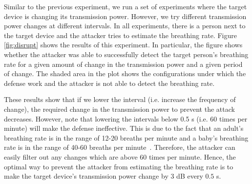 Similar to the previous experiment, we run a set of experiments where the target device is changing its transmission power. However, we try different transmission power changes at different intervals. In all experiments, there is a person next to the target device and the attacker tries to estimate the breathing rate. Figure \ref{fig:disrupt} shows the results of this experiment. In particular, the figure shows whether the attacker was able to successfully detect the target person's breathing rate for a given amount of change in the transmission power and a given period of change. The shaded area in the plot shows the configurations under which the defense work and the attacker is not able to detect the breathing rate. 

These results show that if we lower the interval (i.e. increase the frequency of change), the required change in the transmission power to prevent the attack decreases. However, note that lowering the intervals below 0.5 s (i.e. 60 times per minute) will make the defense ineffective. This is due to the fact that an adult's breathing rate is in the range of 12-20 breaths per minute and a baby's breathing rate is in the range of 40-60 breaths per minute~\cite{healthsite}. Therefore, the attacker can easily filter out any changes which are above 60 times per minute. Hence, the optimal way to prevent the attacker from estimating the breathing rate is to make the target device's transmission power change by $3$ dB every $0.5$ s. 





 
